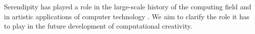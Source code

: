 Serendipity has played a role in the large-scale history of the
computing field \cite{de2013turing} and in artistic applications of
computer technology \cite{reichardt1969cybernetic}.  We aim to clarify
the role it has to play in the future development of computational
creativity.




